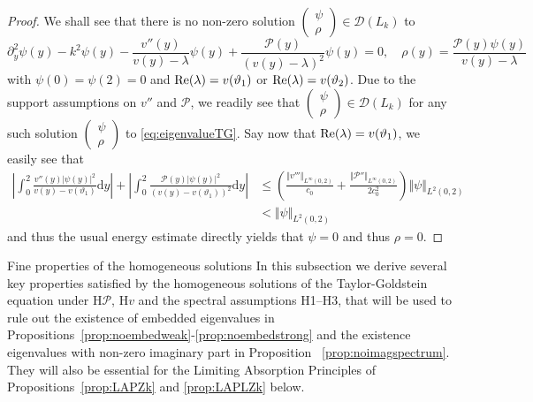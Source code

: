 \documentclass[11pt,reqno]{amsproc}
\makeatletter
\renewcommand\subsection{\@startsection{subsection}{2}%
\normalparindent{.5\linespacing\@plus.7\linespacing}{-.5em}
{\normalfont\bfseries}}
\theoremstyle{definition}
\numberwithin{equation}{section}
\renewcommand{\d}{\mathrm{d}}
\renewcommand{\P}{{\mathcal{P}}}
\def\Re{{\rm Re}}
\makeatother
\begin{document}
\begin{proof}
We shall see that there is no non-zero solution $\begin{pmatrix}
\psi \\ \rho
\end{pmatrix}\in \mathcal{D}(L_k)$ to 
\begin{equation}\label{eq:eigenvalueTG}
\partial_y^2 \psi(y) - k^2\psi(y) - \frac{v''(y)}{v(y) - \lambda}\psi(y) + \frac{\P(y)}{(v(y) - \lambda)^2}\psi(y) = 0, \quad \rho(y) = \frac{\P(y)\psi(y)}{v(y) - \lambda}
\end{equation}
with $\psi(0)=\psi(2)=0$ and $\Re(\lambda) = v(\vartheta_1)$ or $\Re(\lambda) = v(\vartheta_2)$. Due to the support assumptions on $v''$ and $\P$, we readily see that $\begin{pmatrix}
\psi \\ \rho
\end{pmatrix} \in \mathcal{D}(L_k)$ for any such solution $\begin{pmatrix}
\psi \\ \rho
\end{pmatrix}$ to \eqref{eq:eigenvalueTG}. Say now that $\Re(\lambda) = v(\vartheta_1)$, we easily see that
\begin{align*}
\left| \int_0^2  \frac{v''(y)|\psi(y)|^2}{v(y) - v(\vartheta_1)}\d y \right| + \left| \int_0^2  \frac{\P(y)|\psi(y)|^2}{(v(y) - v(\vartheta_1))^2}\d y \right| &\leq \left( \frac{\Vert v'''\Vert_{L^\infty(0,2)}}{c_0} + \frac{\Vert \P'' \Vert_{L^\infty(0,2)}}{2c_0^2} \right) \Vert \psi \Vert_{L^2(0,2)}
\\&< \Vert \psi \Vert_{L^2(0,2)}
\end{align*}
and thus the usual energy estimate directly yields that $\psi = 0$ and thus $\rho = 0$. 
\end{proof}

\subsection{Fine properties of the homogeneous solutions}
{In this subsection we derive several key properties satisfied by the homogeneous solutions of the Taylor-Goldstein equation under {H$\P$, H$v$} and the spectral assumptions H1--H3, that will be used to rule out the existence of embedded eigenvalues in Propositions~\ref{prop:noembedweak}-\ref{prop:noembedstrong} and the existence eigenvalues with non-zero imaginary part in Proposition ~\ref{prop:noimagspectrum}. They will also be essential for the Limiting Absorption Principles of Propositions~\ref{prop:LAPZk} and \ref{prop:LAPLZk} below}.
\end{document}
